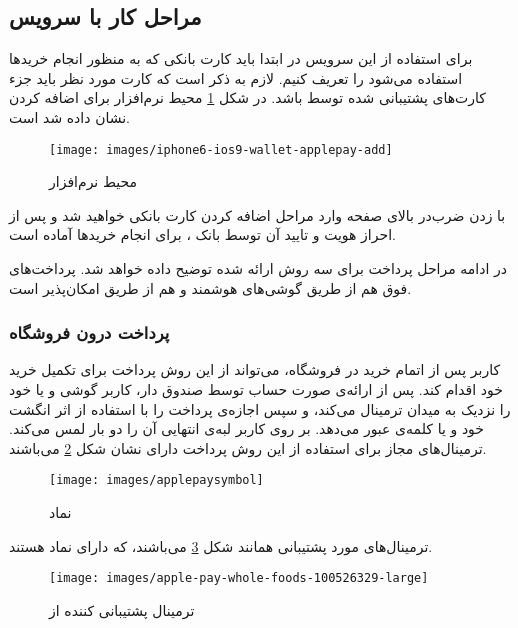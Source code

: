 \documentclass[oneside]{report}
\begin{document}
	\subsection{مراحل کار با سرویس {\normalsize {}} }
	برای استفاده از این سرویس در ابتدا باید کارت بانکی که به منظور انجام خرید‌ها استفاده می‌شود را تعریف کنیم. لازم به ذکر است که کارت مورد نظر باید جزء کارت‌های پشتیبانی شده توسط
									{\normalsize {}} 
									 باشد. در شکل \ref{applepayenvironment} محیط نرم‌افزار برای اضافه کردن نشان داده شد است. 
									 
									 
	\begin{figure}[h]
		\centering
		\texttt{[image: images/iphone6-ios9-wallet-applepay-add]}
		\caption{محیط نرم‌افزار{\footnotesize {}}  }
		\label{applepayenvironment}
	\end{figure}
با زدن ضرب‌در بالای صفحه وارد مراحل اضافه کردن کارت بانکی خواهید شد و پس از احراز هویت و تایید آن توسط بانک ، 
								{\normalsize {}}  
								برای انجام خرید‌ها آماده است. 
								
								در ادامه مراحل پرداخت برای سه روش ارائه شده توضیح داده خواهد شد. پرداخت‌های فوق هم از طریق گوشی‌های هوشمند 
																{\normalsize {}} 
																و هم از طریق 
															{\normalsize {}} 
																								امکان‌پذیر است. 
											
								
	\subsubsection{پرداخت درون فروشگاه} 
	کاربر پس از اتمام خرید در فروشگاه، می‌تواند از این روش پرداخت برای تکمیل خرید خود اقدام کند. پس از  ارائه‌ی صورت حساب توسط صندوق دار، کاربر گوشی و یا 
														{\normalsize {}} 
	 خود را نزدیک به میدان 
									{\normalsize {}}
 ترمینال می‌کند، و سپس اجازه‌ی پرداخت را با استفاده از اثر انگشت خود و یا کلمه‌ی عبور می‌دهد.
 		بر روی  									{\normalsize {}}									 									 									کاربر لبه‌ی انتهایی آن را دو بار لمس می‌کند.
 ترمینال‌های مجاز برای استفاده از این روش پرداخت دارای نشان شکل     
 \ref{applepaysymbol}
می‌باشند.
 \begin{figure}[h]
 	\centering
 	\texttt{[image: images/applepaysymbol]}
 	\caption{نماد 	{\footnotesize {}}}
 	\label{applepaysymbol}
 \end{figure}

 ترمینال‌های مورد پشتیبانی همانند شکل 
 \ref{apple-pay-whole-foods}
 می‌باشند، که دارای نماد 
 									{\normalsize {}}
 									هستند.
	\begin{figure}[h]
		\centering
		\texttt{[image: images/apple-pay-whole-foods-100526329-large]}
		\caption{ترمینال پشتیبانی کننده از {\footnotesize {}}}
		\label{apple-pay-whole-foods}
	\end{figure}
	
\end{document}
